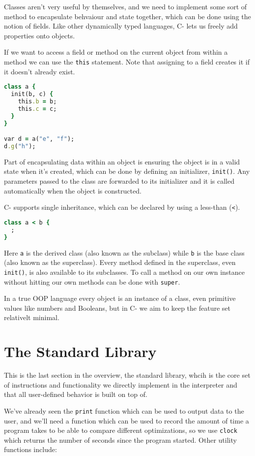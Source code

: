 Classes aren't very useful by themselves, and we need to implement some sort of method to encapsulate behvaiour and state together, which can be done using the notion of fields. Like other dynamically typed languages, C- lets us freely add properties onto objects. 

If we want to access a field or method on the current object from within a method we can use the \verb+this+ statement. Note that assigning to a field creates it if it doesn't already exist.

\begin{lstlisting}[language=ruby]
class a {
  init(b, c) {
    this.b = b;
    this.c = c;
  }
}

var d = a("e", "f");
d.g("h");
\end{lstlisting}

Part of encapsulating data within an object is ensuring the object is in a valid state when it’s created, which can be done by defining an initializer, \verb+init()+. Any parameters passed to the class are forwarded to its initializer and it is called automatically when the object is constructed.

C- supports single inheritance, which can be declared by using a less-than (\verb+<+). 

\begin{lstlisting}[language=ruby]
class a < b {
  ;
}
\end{lstlisting}

Here \verb+a+ is the derived class (also known as the subclass) while \verb+b+ is the base class (also known as the superclass). Every method defined in the superclass, even \verb+init()+, is also available to its subclasses. To call a method on our own instance without hitting our own methods can be done with \verb+super+.

In a true OOP language every object is an instance of a class, even primitive values like numbers and Booleans, but in C- we aim to keep the feature set relativelt minimal.

\section{The Standard Library}

This is the last section in the overview, the standard library, whcih is the core set of instructions and functionality we directly implement in the interpreter and that all user-defined behavior is built on top of.

We've already seen the \verb+print+ function which can be used to output data to the user, and we'll need a function which can be used to record the amount of time a program takes to be able to compare different optimizations, so we use \verb+clock+ which returns the number of seconds since the program started. Other utility functions include:

